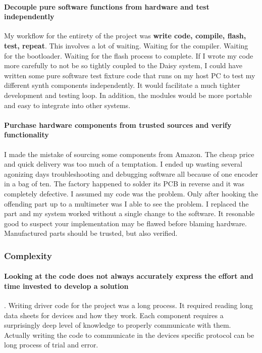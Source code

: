 \documentclass[acmlarge,screen]{acmart}
\begin{document}
	\paragraph{Decouple pure software functions from hardware and test independently} My workflow for the entirety of the project was \textbf{write code, compile, flash, test, repeat}. This involves a lot of waiting. Waiting for the compiler. Waiting for the bootloader. Waiting for the flash process to complete. If I wrote my code more carefully to not be so tightly coupled to the Daisy system, I could have written some pure software test fixture code that runs on my host PC to test my different synth components independently. It would facilitate a much tighter development and testing loop. In addition, the modules would be more portable and easy to integrate into other systems.
	
	\paragraph{Purchase hardware components from trusted sources and verify functionality} I made the mistake of sourcing some components from Amazon. The cheap price and quick delivery was too much of a temptation. I ended up wasting several agonizing days troubleshooting and debugging software all because of one encoder in a bag of ten. The factory happened to solder its PCB in reverse and it was completely defective. I assumed my code was the problem. Only after hooking the offending part up to a multimeter was I able to see the problem. I replaced the part and my system worked without a single change to the software. It resonable good to suspect your implementation may be flawed before blaming hardware. Manufactured parts should be trusted, but also verified.
	
	\subsubsection{Complexity}
	\paragraph{Looking at the code does not always accurately express the effort and time invested to develop a solution}. Writing driver code for the project was a long process. It required reading long data sheets for devices and how they work. Each component requires a surprisingly deep level of knowledge to properly communicate with them. Actually writing the code to communicate in the devices specific protocol can be long process of trial and error. 
	
\end{document}
